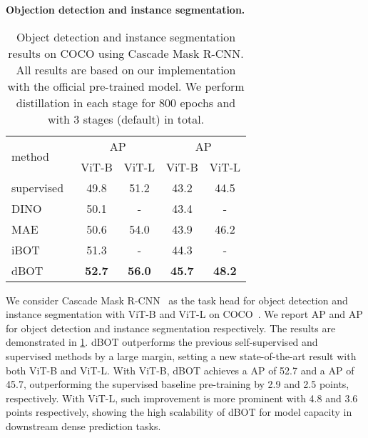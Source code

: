 \documentclass[10pt,twocolumn,letterpaper]{article}
\renewcommand{\paragraph}[1]{\vspace{1.25mm}\noindent\textbf{#1}}
\def\ourmethod{{dBOT}\xspace}
\begin{document}
\paragraph{Objection detection and instance segmentation.}
\begin{table}
    \begin{center}
    \setlength{\tabcolsep}{2.5mm}
    \begin{tabular}{l|cccc}
        \multirow{2}{*}{method}& \multicolumn{2}{c}{AP} & \multicolumn{2}{c}{AP}\\
        &ViT-B&ViT-L&ViT-B&ViT-L\\
        \hline
        \textcolor{gray!80}{supervised~\cite{zhou2021ibot}}&\textcolor{gray!80}{49.8}&\textcolor{gray!80}{51.2}&\textcolor{gray!80}{43.2}&\textcolor{gray!80}{44.5}\\
        DINO~\cite{dino}&50.1&-&43.4&-\\
        MAE~\cite{mae}&50.6&54.0&43.9&46.2\\
        iBOT~\cite{zhou2021ibot}&51.3&-&44.3&-\\
        \hline
        \ourmethod &\textbf{52.7}&\textbf{56.0}&\textbf{45.7}&\textbf{48.2}\\
    \end{tabular}
    \end{center}
    \caption{Object detection and instance segmentation results on COCO using Cascade Mask R-CNN.
    All results are based on our implementation with the official pre-trained model.
    We perform distillation in each stage for 800 epochs and with 3 stages (default) in total. 
    }
    \label{tab:cascade det}
\vspace{-0.2cm}
\end{table}
We consider Cascade Mask R-CNN~\cite{cai2019cascade} as the task head for object detection and instance segmentation with ViT-B and ViT-L on COCO~\cite{coco}. 
We report AP and AP for object detection and instance segmentation respectively.
The results are demonstrated in \cref{tab:cascade det}.
\ourmethod outperforms the previous self-supervised and supervised methods by a large margin, setting a new state-of-the-art result with both ViT-B and ViT-L. 
With ViT-B, \ourmethod achieves a AP of 52.7 and a AP of 45.7, outperforming the supervised baseline pre-training by 2.9 and 2.5 points, respectively. With ViT-L, such improvement is more prominent with 4.8 and 3.6 points respectively, showing the high scalability of \ourmethod for model capacity in downstream dense prediction tasks. 
\end{document}
